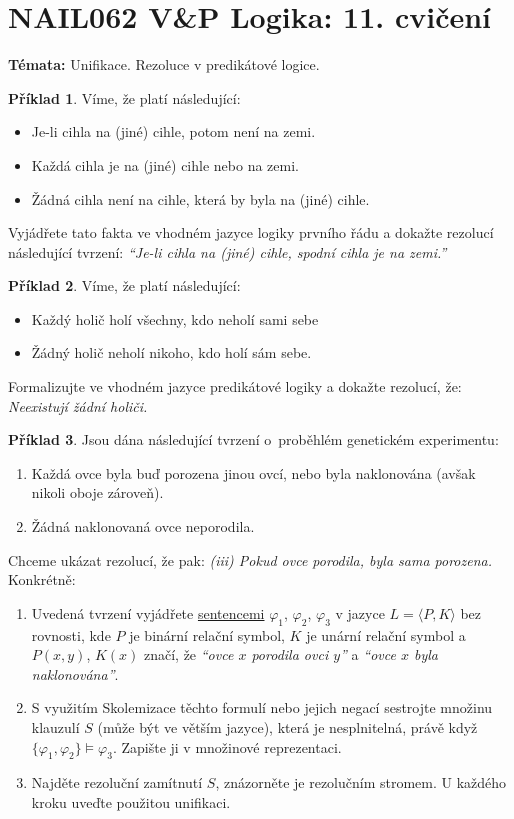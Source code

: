 \documentclass[a4paper]{article}
\theoremstyle{definition}
\newtheorem{problem}{Příklad}
\begin{document}
\section*{NAIL062 V\&P Logika: 11. cvičení}


\textbf{Témata:}
Unifikace. Rezoluce v predikátové logice.


\medskip\begin{problem} Víme, že platí následující:
    \begin{itemize}\it
        \item Je-li cihla na (jiné) cihle, potom není na zemi.
        \item Každá cihla je na (jiné) cihle nebo na zemi.
        \item Žádná cihla není na cihle, která by byla na (jiné) cihle.
    \end{itemize}
    Vyjádřete tato fakta ve vhodném jazyce logiky prvního řádu a dokažte rezolucí následující tvrzení: {\it ``Je-li cihla na (jiné) cihle, spodní cihla je na zemi.''}
\end{problem}
        
    
\medskip\begin{problem} Víme, že platí následující:
    \begin{itemize}\it
        \item Každý holič holí všechny, kdo neholí sami sebe
        \item Žádný holič neholí nikoho, kdo holí sám sebe.
    \end{itemize}
    Formalizujte ve vhodném jazyce predikátové logiky a dokažte rezolucí, že: {\it Neexistují žádní holiči.}
\end{problem}


\medskip\begin{problem}
Jsou dána následující tvrzení o~proběhlém genetickém experimentu:
\begin{enumerate}[label=(\roman*)]\it
    \item Každá ovce byla buď porozena jinou ovcí, nebo byla naklonována (avšak nikoli oboje zároveň).
    \item Žádná naklonovaná ovce neporodila.
\end{enumerate}
Chceme ukázat rezolucí, že pak: {\it (iii) Pokud ovce porodila, byla sama porozena.} Konkrétně:
\begin{enumerate}
    \item Uvedená tvrzení vyjádřete \underline{sentencemi} $\varphi_1$, $\varphi_2$, $\varphi_3$ v jazyce $L=\langle P,K\rangle$ bez rovnosti, kde $P$ je binární relační symbol, $K$ je unární relační symbol a $P(x,y)$, $K(x)$ značí, že \emph{``ovce $x$ porodila ovci $y$''} a \emph{``ovce $x$ byla naklonována''}.    
    \item S využitím Skolemizace těchto formulí nebo jejich negací sestrojte množinu klauzulí $S$ (může být ve větším jazyce), která je nesplnitelná, právě když  $\{\varphi_1, \varphi_2\} \models \varphi_3$. Zapište ji v množinové reprezentaci.
    \item Najděte rezoluční zamítnutí $S$, znázorněte je rezolučním stromem. U každého kroku uveďte použitou unifikaci.
\end{enumerate}
\end{problem}
        
\end{document}
